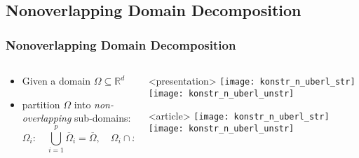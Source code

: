 \subsection{Nonoverlapping Domain Decomposition}
\begin{frame}
  \frametitle<presentation>{Nonoverlapping Domain Decomposition}

  \begin{columns}
    \begin{column}{0.6\linewidth}

      \begin{itemize}
      \item Given a domain $\Omega\subseteq\mathbb{R}^d$
      \item partition $\Omega$ into \emph{non-overlapping}
        sub-domains:
        \[
        \Omega_i\colon\quad \bigcup_{i=1}^p \overline{\Omega}_i = \overline{\Omega}, \quad
        \Omega_i\cap\Omega_j=\emptyset \;\forall i\ne j.
        \]
      \end{itemize}
    \end{column}
    \begin{column}{0.4\linewidth}
      \begin{onlyenv}<presentation>
        \texttt{[image: konstr\_n\_uberl\_str]}
        \vskip5mm
        \texttt{[image: konstr\_n\_uberl\_unstr]}
      \end{onlyenv}
      \begin{onlyenv}<article>
        \texttt{[image: konstr\_n\_uberl\_str]}
        \vskip5mm
        \texttt{[image: konstr\_n\_uberl\_unstr]}
      \end{onlyenv}
    \end{column}
  \end{columns}
\end{frame}

